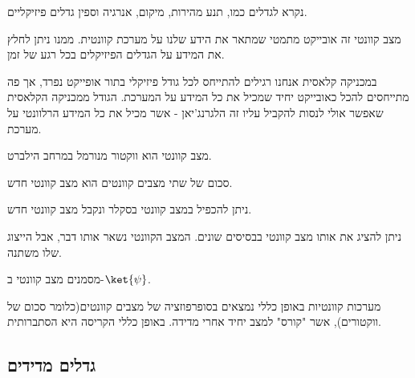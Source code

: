 \documentclass{tstextbook}
\begin{document}
\begin{definition}
נקרא לגדלים כמו, תנע מהירות, מיקום, אנרגיה וספין גדלים פיזיקליים.

\end{definition}
\begin{definition}
מצב קוונטי זה אובייקט מתמטי שמתאר את הידע שלנו על מערכת קוונטית. ממנו ניתן לחלץ את המידע על הגדלים הפיזיקלים בכל רגע של זמן.

\end{definition}
\begin{remark}
במכניקה קלאסית אנחנו רגילים להתייחס לכל גודל פיזיקלי בתור אופייקט נפרד, אך פה מתייחסים להכל כאובייקט יחיד שמכיל את כל המידע על המערכת. הגודל ממכניקה הקלאסית שאפשר אולי לנסות להקביל עליו זה הלגרנג'יאן - אשר מכיל את כל המידע הרלוונטי על מערכת.

\end{remark}
\begin{theorem}
מצב קוונטי הוא ווקטור מנורמל במרחב הילברט.

\end{theorem}
\begin{corollary}
סכום של שתי מצבים קוונטים הוא מצב קוונטי חדש.

\end{corollary}
\begin{corollary}
ניתן להכפיל במצב קוונטי בסקלר ונקבל מצב קוונטי חדש.

\end{corollary}
\begin{corollary}
ניתן להציג את אותו מצב קוונטי בבסיסים שונים. המצב הקוונטי נשאר אותו דבר, אבל הייצוג שלו משתנה.

\end{corollary}
\begin{symbolize}
מסמנים מצב קוונטי ב-\(\ket{\psi}\).

\end{symbolize}
מערכות קוונטיות באופן כללי נמצאים בסופרפוזציה של מצבים קוונטים(כלומר סכום של ווקטורים), אשר "קורס" למצב יחיד אחרי מדידה. באופן כללי הקריסה היא הסתברותית.

\subsection{גדלים מדידים}
\end{document}
